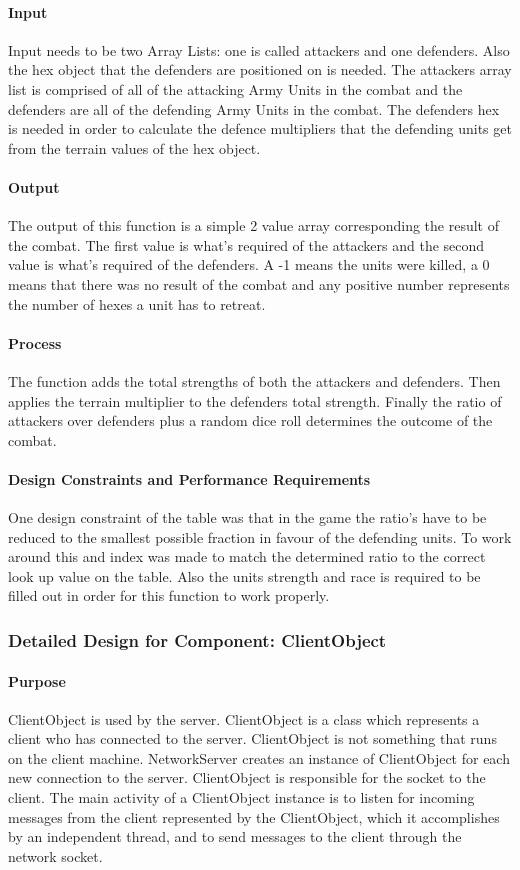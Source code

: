 \documentclass[12pt,a4paper,titlepage]{article}
\begin{document}
\paragraph{Input} Input needs to be two Array Lists: one is called attackers and one defenders. Also the hex object that the defenders are positioned on is needed. The attackers array list is comprised of all of the attacking Army Units in the combat and the defenders are all of the defending Army Units in the combat. The defenders hex is needed in order to calculate the defence multipliers that the defending units get from the terrain values of the hex object.
\paragraph{Output} The output of this function is a simple 2 value array corresponding the result of the combat. The first value is what's required of the attackers and the second value is what's required of the defenders. A -1 means the units were killed, a 0 means that there was no result of the combat and any positive number represents the number of hexes a unit has to retreat. 
\paragraph{Process} The function adds the total strengths of both the attackers and defenders. Then applies the terrain multiplier to the defenders total strength. Finally the ratio of attackers over defenders plus a random dice roll determines the outcome of the combat.  
\paragraph{Design Constraints and Performance Requirements} One design constraint of the table was that in the game the ratio's have to be reduced to the smallest possible fraction in favour of the defending units. To work around this and index was made to match the determined ratio to the correct look up value on the table. Also the units strength and race is required to be filled out in order for this function to work properly. 

\subsubsection{Detailed Design for Component: ClientObject }
\paragraph{Purpose} ClientObject is used by the server. ClientObject is a class which represents a client who has connected to the server. ClientObject is not something that runs on the client machine. NetworkServer creates an instance of ClientObject for each new connection to the server. ClientObject is responsible for the socket to the client. The main activity of a ClientObject instance is to listen for incoming messages from the client represented by the ClientObject, which it accomplishes by an independent thread, and to send messages to the client through the network socket.
\end{document}
